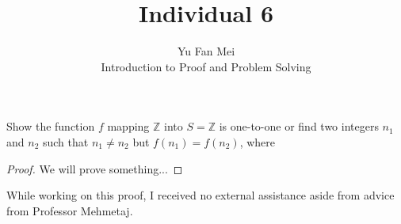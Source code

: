 \documentclass[12pt]{article}
\newenvironment{problem}[2][Problem]{\begin{trivlist}
\item[\hskip \labelsep {\bfseries #1}\hskip \labelsep {\bfseries #2.}]}{\end{trivlist}}
\begin{document}

\title{Individual 6}%
\author{Yu Fan Mei\\ %
	Introduction to Proof and Problem Solving} %

\maketitle

\begin{problem}{12} %
    Show the function $f$ mapping $\mathbb{Z}$ into $S = \mathbb{Z} $ is one-to-one or find two integers $n_1$ and $n_2$ such that $n_1 \neq n_2$ but $f(n_1) = f(n_2)$, where

    
    

\end{problem}

\begin{proof} We will prove something...
\end{proof}


\noindent While working on this proof, I received no external assistance aside from advice from Professor Mehmetaj.
\end{document}
